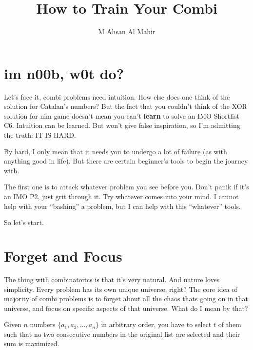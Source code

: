 \documentclass[12pt,a4paper]{article}
\title{\textbf{How to Train Your Combi}}
\author{M Ahsan Al Mahir}
\begin{document}
	
	\maketitle
	
	\section{im n00b, w0t do?}
		
		Let's face it, combi problems need intuition. How else does one think of the solution for Catalan's numbers? But the fact that you couldn't think of the XOR solution for nim game doesn't mean you can't \textbf{learn} to solve an IMO Shortlist C6. Intuition can be learned. But won't give false inspiration, so I'm admitting the truth: IT IS HARD.
		
		By hard, I only mean that it needs you to undergo a lot of failure (as with anything good in life). But there are certain beginner's tools to begin the journey with. 
		
		The first one is to attack whatever problem you see before you. Don't panik if it's an IMO P2, just grit through it. Try whatever comes into your mind. I cannot help with your ``bashing'' a problem, but I can help with this ``whatever'' tools.
		
		So let's start.
		
		
	
	\section{Forget and Focus}
		
		The thing with combinatorics is that it's very natural. And nature loves simplicity. Every problem has its own unique universe, right? The core idea of majority of combi problems is to forget about all the chaos thats going on in that universe, and focus on specific aspects of that universe. What do I mean by that?
		
		
		\begin{example}
			Given $ n $ numbers $ \{a_1, a_2, ..., a_n\} $ in arbitrary order, you have to select $ t $ of them such that no two consecutive numbers in the original list are selected and their sum is maximized.
		\end{example}
		
\end{document}
